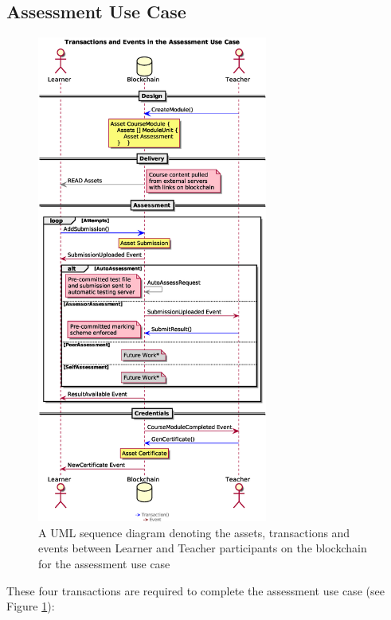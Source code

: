 \subsection{Assessment Use Case}

\begin{figure}[!ht]
	\centering
	\includegraphics[width=0.675\textwidth]{assessmentloop}
	\caption[Assessment Use Case]
	{A UML sequence diagram denoting the assets, transactions and events between
		Learner and Teacher participants on the blockchain for the assessment use case}
	\label{fig:assessmentloop}
\end{figure}

These four transactions are required to complete the assessment use case (see Figure \ref{fig:assessmentloop}):

